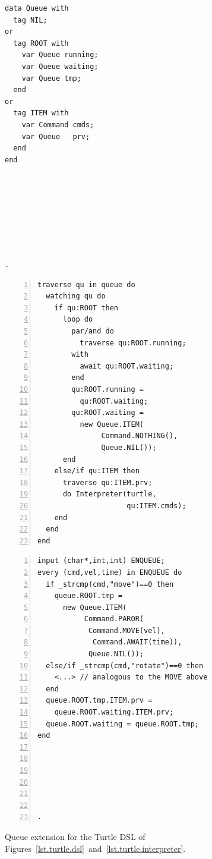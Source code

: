 \documentclass{acm_proc_article-sp}
\newcommand{\code}[1] {{\small{\texttt{#1}}}}
\begin{document}
\begin{figure}%
\begin{minipage}[t]{0.20\linewidth}
\begin{lstlisting}[title=CODE-1: The \code{Queue} data type]
data Queue with
  tag NIL;
or
  tag ROOT with
    var Queue running;
    var Queue waiting;
    var Queue tmp;
  end
or
  tag ITEM with
    var Command cmds;
    var Queue   prv;
  end
end








.
\end{lstlisting}
\end{minipage}
%
\begin{minipage}[t]{0.36\linewidth}
\begin{lstlisting}[numbers=left,xleftmargin=3.5em,title=CODE-2: Queue traversal]
traverse qu in queue do
  watching qu do
    if qu:ROOT then
      loop do
        par/and do
          traverse qu:ROOT.running;
        with
          await qu:ROOT.waiting;
        end
        qu:ROOT.running =
          qu:ROOT.waiting;
        qu:ROOT.waiting =
          new Queue.ITEM(
               Command.NOTHING(),
               Queue.NIL());
      end
    else/if qu:ITEM then
      traverse qu:ITEM.prv;
      do Interpreter(turtle,
                     qu:ITEM.cmds);
    end
  end
end
\end{lstlisting}
\end{minipage}
%
\begin{minipage}[t]{0.39\linewidth}
\begin{lstlisting}[numbers=left,xleftmargin=3.5em,title=CODE-3: Command enqueuing]
input (char*,int,int) ENQUEUE;
every (cmd,vel,time) in ENQUEUE do
  if _strcmp(cmd,"move")==0 then
    queue.ROOT.tmp =
      new Queue.ITEM(
           Command.PAROR(
            Command.MOVE(vel),
             Command.AWAIT(time)),
            Queue.NIL());
  else/if _strcmp(cmd,"rotate")==0 then
    <...> // analogous to the MOVE above
  end
  queue.ROOT.tmp.ITEM.prv =
    queue.ROOT.waiting.ITEM.prv;
  queue.ROOT.waiting = queue.ROOT.tmp;
end






.
\end{lstlisting}
\end{minipage}
%
\caption{ Queue extension for the Turtle DSL of
          Figures~\ref{lst.turtle.dsl}~and~\ref{lst.turtle.interpreter}.
\label{lst.turtle.queue}
}
\end{figure}
\end{document}
